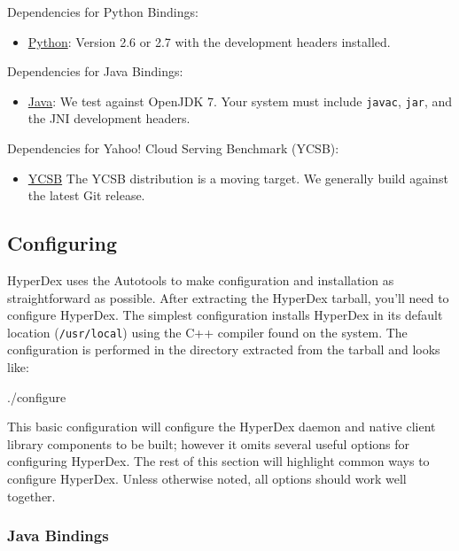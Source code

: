 Dependencies for Python Bindings:

\begin{itemize}
\item \href{http://python.org/}{Python}: Version 2.6 or 2.7 with the
    development headers installed.
\end{itemize}

Dependencies for Java Bindings:

\begin{itemize}
\item \href{http://openjdk.java.net/}{Java}: We test against OpenJDK 7.  Your
    system must include \texttt{javac}, \texttt{jar}, and the JNI development
    headers.
\end{itemize}

Dependencies for Yahoo! Cloud Serving Benchmark (YCSB):

\begin{itemize}
\item \href{https://github.com/brianfrankcooper/YCSB/wiki}{YCSB} The YCSB
    distribution is a moving target.  We generally build against the latest Git
    release.
\end{itemize}

\subsection{Configuring}
\label{sec:installation:source:configure}

HyperDex uses the Autotools to make configuration and installation as
straightforward as possible.  After extracting the HyperDex tarball, you'll need
to configure HyperDex.  The simplest configuration installs HyperDex in its
default location (\texttt{/usr/local}) using the C++ compiler found on the
system.  The configuration is performed in the directory extracted from the
tarball and looks like:

\begin{consolecode}
./configure
\end{consolecode}

This basic configuration will configure the HyperDex daemon and native client
library components to be built; however it omits several useful options for
configuring HyperDex.  The rest of this section will highlight common ways to
configure HyperDex.  Unless otherwise noted, all options should work well
together.

\subsubsection{Java Bindings}
\label{sec:installation:source:java}

